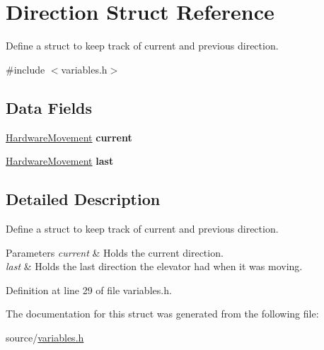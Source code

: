 \hypertarget{structDirection}{}\section{Direction Struct Reference}
\label{structDirection}


Define a struct to keep track of current and previous direction.  




{\ttfamily \#include $<$variables.\+h$>$}

\subsection*{Data Fields}
\begin{DoxyCompactItemize}
\item 
\mbox{\label{structDirection_a9a25b1f4fa501943844ed3163d8d206f}} 
\hyperlink{hardware_8h_a2167c399a24df296afc432bcb88228af}{Hardware\+Movement} {\bfseries current}
\item 
\mbox{\label{structDirection_a6615cfe7b8c667d52f863664e15059a3}} 
\hyperlink{hardware_8h_a2167c399a24df296afc432bcb88228af}{Hardware\+Movement} {\bfseries last}
\end{DoxyCompactItemize}


\subsection{Detailed Description}
Define a struct to keep track of current and previous direction. 


\begin{DoxyParams}{Parameters}
{\em current} & Holds the current direction. \\
\hline
{\em last} & Holds the last direction the elevator had when it was moving. \\
\hline
\end{DoxyParams}


Definition at line 29 of file variables.\+h.



The documentation for this struct was generated from the following file\+:\begin{DoxyCompactItemize}
\item 
source/\hyperlink{variables_8h}{variables.\+h}\end{DoxyCompactItemize}
